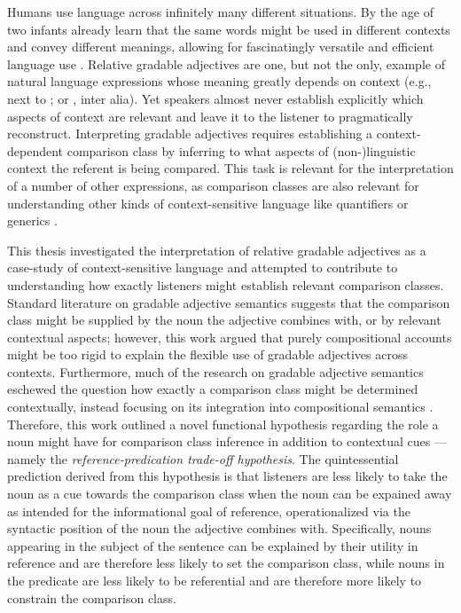 Humans use language across infinitely many different situations. By the age of two infants already learn that the same words might be used in different contexts and convey different meanings, allowing for fascinatingly versatile and efficient language use \parencite{Mintz2002, ebeling1994children}. 
Relative gradable adjectives are one, but not the only, example of natural language expressions whose meaning greatly depends on context (e.g., next to \textcite[indexicals][]{braun2017}; or \textcite[anaphoras][]{goldberg2017one}, inter alia). Yet speakers almost never establish explicitly which aspects of context are relevant and leave it to the listener to pragmatically reconstruct. Interpreting gradable adjectives requires establishing a context-dependent comparison class by inferring to what aspects of (non-)linguistic context the referent is being compared. This task is relevant for the interpretation of a number of other expressions, as comparison classes are also relevant for understanding other kinds of context-sensitive language like quantifiers \parencite[e.g., "John ate \emph{many} of hot dogs",][]{scholler2017semantic} or generics \parencite[e.g., "Dogs are friendly" \emph{[relative to other animals]},][]{tessler2019language}. 

This thesis investigated the interpretation of relative gradable adjectives as a case-study of context-sensitive language and attempted to contribute to understanding how exactly listeners might establish relevant comparison classes. 
Standard literature on gradable adjective semantics suggests that the comparison class might be supplied by the noun the adjective combines with, or by relevant contextual aspects; however, this work argued that purely compositional accounts might be too rigid to explain the flexible use of gradable adjectives across contexts. Furthermore, much of the research on gradable adjective semantics eschewed the question how exactly a comparison class might be determined contextually, instead focusing on its integration into compositional semantics \parencite{Kennedy2007, kennedy2012, Kamp1975, Cresswell1976, Solt2009}. 
Therefore, this work outlined a novel functional hypothesis regarding the role a noun might have for comparison class inference in addition to contextual cues --- namely the \emph{reference-predication trade-off hypothesis}. The quintessential prediction derived from this hypothesis is that listeners are less likely to take the noun as a cue towards the comparison class when the noun can be expained away as intended for the informational goal of reference, operationalized via the syntactic position of the noun the adjective combines with. Specifically, nouns appearing in the subject of the sentence can be explained by their utility in reference and are therefore less likely to set the comparison class, while nouns in the predicate are less likely to be referential and are therefore more likely to constrain the comparison class.

